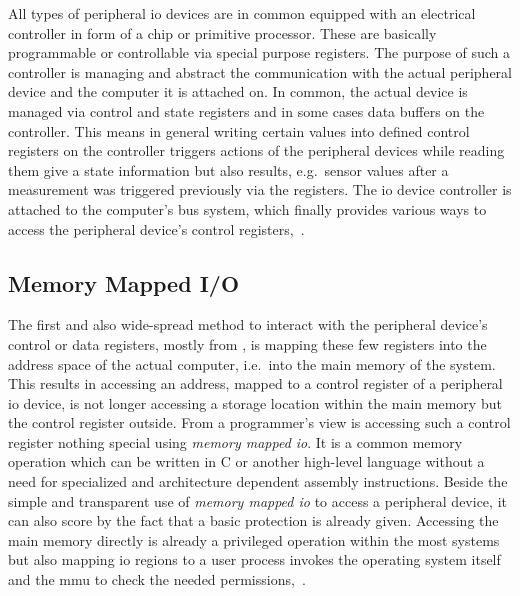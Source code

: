 All types of peripheral \ac{io} devices are in common equipped with an electrical controller in form of a chip or primitive processor.
These are basically programmable or controllable via special purpose registers.
The purpose of such a controller is managing and abstract the communication with the actual peripheral device and the computer it is attached on.
In common, the actual device is managed via control and state registers and in some cases data buffers on the controller.
This means in general writing certain values into defined control registers on the controller triggers actions of the peripheral devices while reading them give a state information but also results, e.g.\ sensor values after a measurement was triggered previously via the registers.
The \ac{io} device controller is attached to the computer's bus system, which finally provides various ways to access the peripheral device's control registers\cite{tanenbaum-modern-operating-systems},~\cite{glatz2015betriebssysteme}. 

\subsection{Memory Mapped I/O}
The first and also wide-spread method to interact with the peripheral device's control or data registers, mostly from , is mapping these few registers into the address space of the actual computer, i.e.\ into the main memory of the system.
This results in accessing an address, mapped to a control register of a peripheral \ac{io} device, is not longer accessing a storage location within the main memory but the control register outside.
From a programmer's view is accessing such a control register nothing special using \textit{memory mapped \ac{io}}.
It is a common memory operation which can be written in C or another high-level language without a need for specialized and architecture dependent assembly instructions.
Beside the simple and transparent use of \textit{memory mapped \ac{io}} to access a peripheral device, it can also score by the fact that a basic protection is already given.
Accessing the main memory directly is already a privileged operation within the most systems but also mapping \ac{io} regions to a user process invokes the operating system itself and the \ac{mmu} to check the needed permissions\cite{tanenbaum-modern-operating-systems},~\cite{brause2017betriebssysteme}.  

